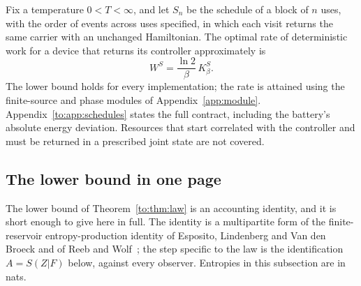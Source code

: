 \FloatBarrier
\begin{theorem}\label{to:thm:law}
Fix a temperature $0<T<\infty$, and let $S_n$ be the schedule of a block of $n$ uses, with the order of events across uses specified, in which each visit returns the same carrier with an unchanged Hamiltonian. The optimal rate of deterministic work for a device that returns its controller approximately is
\[
W^S=\frac{\ln2}{\beta}\,K_\beta^S.
\]
The lower bound holds for every implementation; the rate is attained using the finite-source and phase modules of Appendix~\ref{app:module}. Appendix~\ref{to:app:schedules} states the full contract, including the battery's absolute energy deviation. Resources that start correlated with the controller and must be returned in a prescribed joint state are not covered.
\end{theorem}


\subsection{The lower bound in one page}\label{sec:lowerbound}

The lower bound of Theorem~\ref{to:thm:law} is an accounting identity, and it is short enough to give here in full. The identity is a multipartite form of the finite-reservoir entropy-production identity of Esposito, Lindenberg and Van den Broeck and of Reeb and Wolf~\cite{EspositoLindenbergVandenBroeck10,ReebWolf14}; the step specific to the law is the identification $A=S(Z|F)$ below, against every observer. Entropies in this subsection are in nats.

